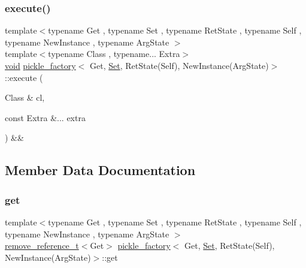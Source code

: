 \subsubsection{\texorpdfstring{execute()}{execute()}}
{\footnotesize\ttfamily template$<$typename Get , typename Set , typename Ret\+State , typename Self , typename New\+Instance , typename Arg\+State $>$ \\
template$<$typename Class , typename... Extra$>$ \\
\mbox{\hyperlink{_s_d_l__opengles2__gl2ext_8h_ae5d8fa23ad07c48bb609509eae494c95}{void}} \mbox{\hyperlink{structpickle__factory}{pickle\+\_\+factory}}$<$ Get, \mbox{\hyperlink{_python-ast_8h_a8b39bad9fda6bc73af75e4d6085bcf91}{Set}}, Ret\+State(Self), New\+Instance(Arg\+State)$>$\+::execute (\begin{DoxyParamCaption}\item[{Class \&}]{cl,  }\item[{const Extra \&...}]{extra }\end{DoxyParamCaption}) \&\&\hspace{0.3cm}{\ttfamily [inline]}}



\subsection{Member Data Documentation}
\mbox{\label{structpickle__factory_3_01_get_00_01_set_00_01_ret_state_07_self_08_00_01_new_instance_07_arg_state_08_4_a23424db78247af91a611fd9780590768}} 
\subsubsection{\texorpdfstring{get}{get}}
{\footnotesize\ttfamily template$<$typename Get , typename Set , typename Ret\+State , typename Self , typename New\+Instance , typename Arg\+State $>$ \\
\mbox{\hyperlink{detail_2common_8h_a3a08cea569e6926ac8d7d74dd7178b5f}{remove\+\_\+reference\+\_\+t}}$<$Get$>$ \mbox{\hyperlink{structpickle__factory}{pickle\+\_\+factory}}$<$ Get, \mbox{\hyperlink{_python-ast_8h_a8b39bad9fda6bc73af75e4d6085bcf91}{Set}}, Ret\+State(Self), New\+Instance(Arg\+State)$>$\+::get}

